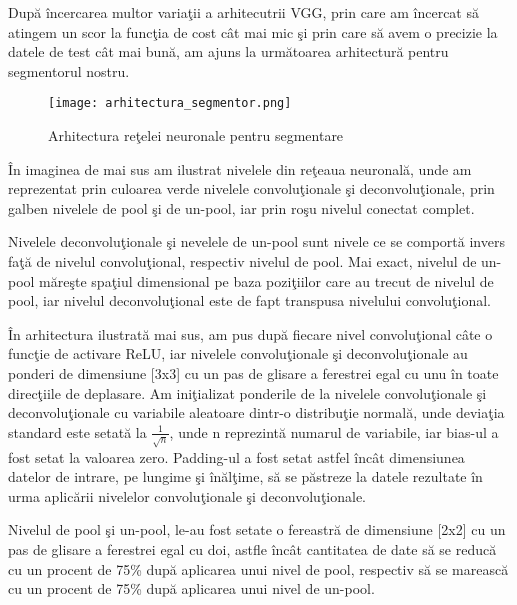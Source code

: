 \par

Dup\u{a} \^{i}ncercarea multor varia\c{t}ii a arhitecutrii VGG, prin care am \^{i}ncercat s\u{a} atingem un scor la func\c{t}ia de cost c\^{a}t mai mic \c{s}i prin care s\u{a} avem o precizie la datele de test c\^{a}t mai bun\u{a}, am ajuns la urm\u{a}toarea arhitectur\u{a} pentru segmentorul nostru.


\begin{figure}[h!]
  \center
  \texttt{[image: arhitectura\_segmentor.png]}
  \caption{Arhitectura re\c{t}elei neuronale pentru segmentare}
\end{figure}

\^{I}n imaginea de mai sus am ilustrat nivelele din re\c{t}eaua neuronal\u{a}, unde am reprezentat prin culoarea verde nivelele convolu\c{t}ionale \c{s}i deconvolu\c{t}ionale, prin galben nivelele de pool \c{s}i de un-pool, iar prin ro\c{s}u nivelul conectat complet.

\par

Nivelele deconvolu\c{t}ionale \c{s}i nevelele de un-pool sunt nivele ce se comport\u{a} invers fa\c{t}\u{a} de nivelul convolu\c{t}ional, respectiv nivelul de pool. Mai exact, nivelul de un-pool m\u{a}re\c{s}te spa\c{t}iul dimensional pe baza pozi\c{t}iilor care au trecut de nivelul de pool, iar nivelul deconvolu\c{t}ional este de fapt transpusa nivelului convolu\c{t}ional.

\par

\^{I}n arhitectura ilustrat\u{a} mai sus, am pus dup\u{a} fiecare nivel convolu\c{t}ional c\^{a}te o func\c{t}ie de activare ReLU, iar nivelele convolu\c{t}ionale \c{s}i deconvolu\c{t}ionale au ponderi de dimensiune [3x3] cu un pas de glisare a ferestrei egal cu unu \^{i}n toate direc\c{t}iile de deplasare. Am ini\c{t}ializat ponderile de la nivelele convolu\c{t}ionale \c{s}i deconvolu\c{t}ionale cu variabile aleatoare dintr-o distribu\c{t}ie normal\u{a}, unde devia\c{t}ia standard este setat\u{a} la $\frac{1}{\sqrt{n}}$, unde n reprezint\u{a} numarul de variabile, iar bias-ul a fost setat la valoarea zero. Padding-ul a fost setat astfel \^{i}nc\^{a}t dimensiunea datelor de intrare, pe lungime \c{s}i \^{i}n\u{a}l\c{t}ime, s\u{a} se p\u{a}streze la datele rezultate \^{i}n urma aplic\u{a}rii nivelelor convolu\c{t}ionale \c{s}i deconvolu\c{t}ionale.

\par

Nivelul de pool \c{s}i un-pool, le-au fost setate o fereastr\u{a} de dimensiune [2x2] cu un pas de glisare a ferestrei egal cu doi, astfle \^{i}nc\^{a}t cantitatea de date s\u{a} se reduc\u{a} cu un procent de 75\% dup\u{a} aplicarea unui nivel de pool, respectiv s\u{a} se mareasc\u{a} cu un procent de 75\% dup\u{a} aplicarea unui nivel de un-pool.

